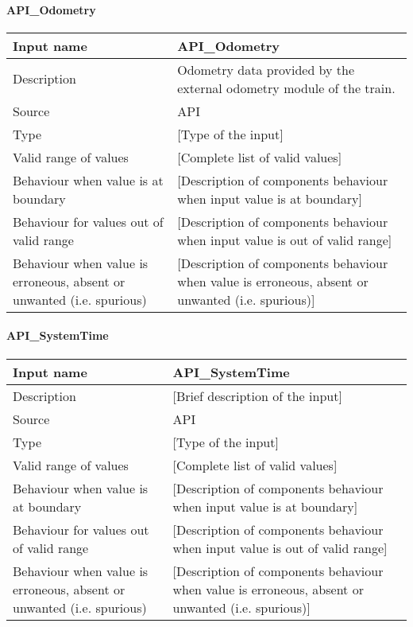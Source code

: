 \paragraph{API\_Odometry}

\begin{longtable}{p{}p{}}
\toprule
Input name				& API\_Odometry \\
\midrule
Description				& Odometry data provided by the external odometry module of the train. \\
\midrule
Source					& API \\ 
\midrule
Type					& [Type of the input] \\
\midrule
Valid range of values	& [Complete list of valid values] \\
\midrule
Behaviour when value is at boundary	& [Description of components behaviour when input value is at boundary] \\
\midrule
Behaviour for values out of valid range	& [Description of components behaviour when input value is out of valid range] \\
\midrule
Behaviour when value is erroneous, absent or unwanted (i.e. spurious) & [Description of components behaviour when value is erroneous, absent or unwanted (i.e. spurious)] \\
\bottomrule
\end{longtable}

\paragraph{API\_SystemTime}

\begin{longtable}{p{}p{}}
\toprule
Input name				& API\_SystemTime \\
\midrule
Description				& [Brief description of the input] \\
\midrule
Source					& API \\ 
\midrule
Type					& [Type of the input] \\
\midrule
Valid range of values	& [Complete list of valid values] \\
\midrule
Behaviour when value is at boundary	& [Description of components behaviour when input value is at boundary] \\
\midrule
Behaviour for values out of valid range	& [Description of components behaviour when input value is out of valid range] \\
\midrule
Behaviour when value is erroneous, absent or unwanted (i.e. spurious) & [Description of components behaviour when value is erroneous, absent or unwanted (i.e. spurious)] \\
\bottomrule
\end{longtable}

